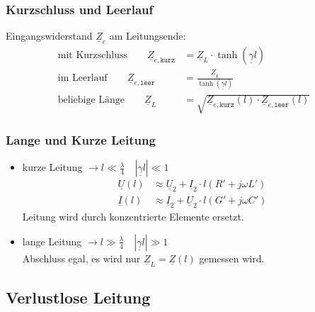 \subsubsection{Kurzschluss und Leerlauf}
Eingangswiderstand $ \underline{Z}_e $ am Leitungsende:
\begin{align*}
	\text{mit Kurzschluss} \qquad \underline{Z}_{e,\texttt{kurz}} & = \underline{Z}_L \cdot \tanh(\underline{\gamma}l)                                 \\
	\text{im Leerlauf} \qquad
	\underline{Z}_{e,\texttt{leer}}                               & = \tfrac{\underline{Z}_L}{\tanh(\underline{\gamma}l)}                              \\
	\text{beliebige Länge} \qquad \underline{Z}_L                 & =\sqrt{\underline{Z}_{e,\texttt{kurz}}(l)\cdot \underline{Z}_{e,\texttt{leer}}(l)}
\end{align*}

\subsubsection{Lange und Kurze Leitung}
\begin{itemize}
	\item kurze Leitung $\rightarrow l \ll \tfrac{\lambda}{4} \quad |\underline{\gamma}l| \ll 1 $
	      \begin{align*}
		      \underline{U}(l) & \approx \underline{U}_2 + \underline{I}_2 \cdot l (R' + j\omega L') \\
		      \underline{I}(l) & \approx \underline{I}_2 + \underline{U}_2 \cdot l (G'+j\omega C')
	      \end{align*}
	      Leitung wird durch konzentrierte Elemente ersetzt.

	\item lange Leitung $\rightarrow l \gg \tfrac{\lambda}{4} \quad |\underline{\gamma}l| \gg 1$\\
	      Abschluss egal, es wird nur $ \underline{Z}_L = \underline{Z}(l) $ gemessen wird.
\end{itemize}

\subsection{Verlustlose Leitung}
